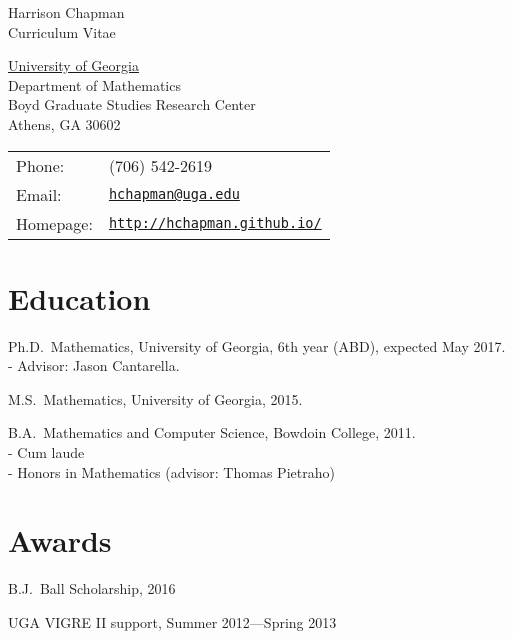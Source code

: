 \documentclass[letterpaper]{article}
\def\name{Harrison Chapman}
\renewenvironment{itemize}{
  \begin{list}{}{
    \setlength{\leftmargin}{1.5em}
  }
}{
  \end{list}
}
\begin{document}
{\huge \name}\\
{\large\sc Curriculum Vitae}


\vspace{0.25in}

\begin{minipage}{0.45\linewidth}
  \href{http://www.uga.edu/}{University of Georgia} \\
  Department of Mathematics \\
  Boyd Graduate Studies Research Center \\
  Athens, GA 30602
\end{minipage}
\begin{minipage}{0.45\linewidth}
  \begin{tabular}{ll}
    Phone: & (706) 542-2619 \\
    Email: & \href{mailto:hchapman@uga.edu}{\tt hchapman@uga.edu} \\
    Homepage: & \href{http://hchapman.github.io/}{\tt http://hchapman.github.io/} \\
  \end{tabular}
\end{minipage}

\section*{Education}

\begin{itemize}
\item Ph.D.\ Mathematics, University of Georgia, 6th year (ABD), expected May
  2017.\\
  - \quad Advisor: Jason Cantarella.
\item M.S.\ Mathematics, University of Georgia, 2015.
\item B.A.\ Mathematics and Computer Science, Bowdoin College,
  2011.\\
  - \quad Cum laude \\
  - \quad Honors in Mathematics (advisor: Thomas Pietraho)
\end{itemize}

 \section*{Awards}

 \begin{itemize}
 \item B.J.\ Ball Scholarship, 2016
 \item UGA VIGRE II support, Summer 2012---Spring 2013
 \end{itemize}
\end{document}
